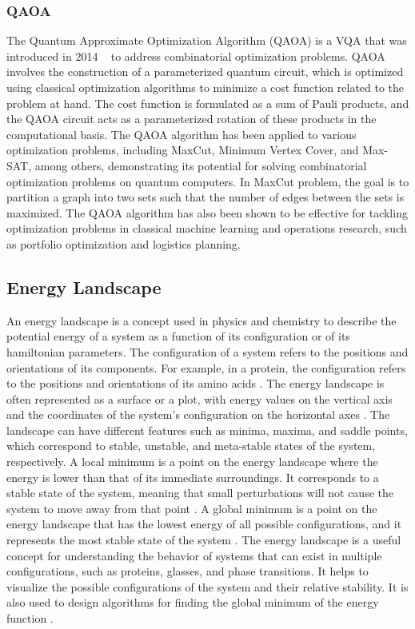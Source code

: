\subsubsection{QAOA}
The Quantum Approximate Optimization Algorithm (QAOA) is a VQA that was introduced in 2014 ~\cite{farhi2014quantum} to address combinatorial optimization problems.
QAOA involves the construction of a parameterized quantum circuit, which is optimized using
classical optimization algorithms to minimize a cost function related to the problem at hand.
The cost function is formulated as a sum of Pauli products, and the QAOA circuit acts as a parameterized
rotation of these products in the computational basis. The QAOA algorithm has been applied to various
optimization problems, including MaxCut, Minimum Vertex Cover, and Max-SAT, among others, demonstrating
its potential for solving combinatorial optimization problems on quantum computers.
In MaxCut problem, the goal is to partition a graph into
two sets such that the number of edges between the sets is maximized.
The QAOA algorithm has also been shown to be effective for tackling optimization problems in classical
machine learning and operations research, such as portfolio optimization and logistics planning.


\subsection{Energy Landscape}\label{subsec:energy-landscape}
An energy landscape is a concept used in physics and chemistry to describe the potential energy of a system as a function
of its configuration or of its hamiltonian parameters\cite{wales2003energy}. The configuration of a system refers to the positions and orientations of
its components. For example, in a protein, the configuration refers to the positions and orientations of its amino
acids \cite{dill2012protein}. The energy landscape is often represented as a surface or a plot, with energy values on
the vertical axis and the coordinates of the system's configuration on the horizontal axes \cite{wales2003energy}.
The landscape can have different features such as minima, maxima, and saddle points, which correspond to stable,
unstable, and meta-stable states of the system, respectively. A local minimum is a point on the energy landscape where
the energy is lower than that of its immediate surroundings. It corresponds to a stable state of the system,
meaning that small perturbations will not cause the system to move away from that point \cite{wales2003energy}.
A global minimum is a point on the energy landscape that has the lowest energy of all possible configurations,
and it represents the most stable state of the system \cite{wales2003energy}. The energy landscape is a useful concept
for understanding the behavior of systems that can exist in multiple configurations, such as proteins, glasses,
and phase transitions. It helps to visualize the possible configurations of the system and their relative stability.
It is also used to design algorithms for finding the global minimum of the energy function \cite{wales1997global}.

